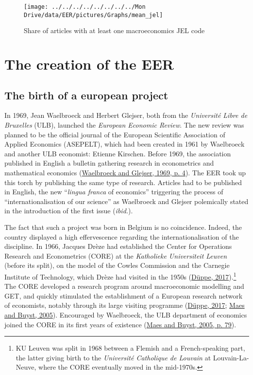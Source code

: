 \documentclass[
]{article}
\begin{document}
\begin{figure}[h]

{\centering \texttt{[image: ../../../../../../../../Mon Drive/data/EER/pictures/Graphs/mean\_jel]} 

}

\caption{Share of articles with at least one macroeconomics JEL code}\label{fig:plot-jel}
\end{figure}

\hypertarget{EER-creation}{%
\section{The creation of the EER}\label{EER-creation}}

\hypertarget{the-birth-of-a-european-project}{%
\subsection{The birth of a european
project}\label{the-birth-of-a-european-project}}

In 1969, Jean Waelbroeck and Herbert Glejser, both from the
\emph{Université Libre de Bruxelles} (ULB), launched the \emph{European
Economic Review}. The new review was planned to be the official journal
of the European Scientific Association of Applied Economics (ASEPELT),
which had been created in 1961 by Waelbroeck and another ULB economist:
Etienne Kirschen. Before 1969, the association published in English a
bulletin gathering research in econometrics and mathematical economics
(\protect\hyperlink{ref-waelbroeck1969}{Waelbroeck and Glejser, 1969, p.
4}). The EER took up this torch by publishing the same type of research.
Articles had to be published in English, the new ``\emph{lingua franca}
of economics'' triggering the process of ``internationalisation of our
science'' as Waelbroeck and Glejser polemically stated in the
introduction of the first issue (\emph{ibid.}).

The fact that such a project was born in Belgium is no coincidence.
Indeed, the country displayed a high effervescence regarding the
internationalisation of the discipline. In 1966, Jacques Drèze had
established the Center for Operations Research and Econometrics (CORE)
at the \emph{Katholieke Universiteit Leuven} (before its split), on the
model of the Cowles Commission and the Carnegie Institute of Technology,
which Drèze had visited in the 1950s
(\protect\hyperlink{ref-duppe2017}{Düppe, 2017}).\footnote{KU Leuven was
  split in 1968 between a Flemish and a French-speaking part, the latter
  giving birth to the \emph{Université Catholique de Louvain} at
  Louvain-La-Neuve, where the CORE eventually moved in the mid-1970s.}
The CORE developed a research program around macroeconomic modelling and
GET, and quickly stimulated the establishment of a European research
network of economists, notably through its large visiting programme
(\protect\hyperlink{ref-duppe2017}{Düppe, 2017};
\protect\hyperlink{ref-maes2005}{Maes and Buyst, 2005}). Encouraged by
Waelbroeck, the ULB department of economics joined the CORE in its first
years of existence (\protect\hyperlink{ref-maes2005}{Maes and Buyst,
2005, p. 79}).
\end{document}
